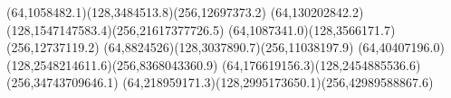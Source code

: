 {(64,1058482.1)(128,3484513.8)(256,12697373.2)}
{(64,130202842.2)(128,1547147583.4)(256,21617377726.5)}
{(64,1087341.0)(128,3566171.7)(256,12737119.2)}
{(64,8824526)(128,3037890.7)(256,11038197.9)}
{(64,40407196.0)(128,2548214611.6)(256,8368043360.9)}
{(64,176619156.3)(128,2454885536.6)(256,34743709646.1)}
{(64,218959171.3)(128,2995173650.1)(256,42989588867.6)}